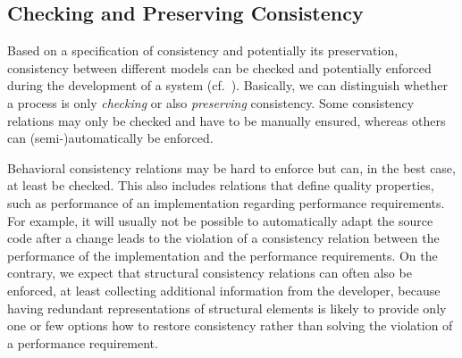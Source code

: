 \subsection{Checking and Preserving Consistency}
\label{chap:networks:notions:check_preserve}

Based on a specification of consistency and potentially its preservation, consistency between different models can be checked and potentially enforced during the development of a system (cf.~\cite{qvt}).
Basically, we can distinguish whether a process is only \emph{checking} or also \emph{preserving} consistency.
Some consistency relations may only be checked and have to be manually ensured, whereas others can (semi-)automatically be enforced.

Behavioral consistency relations may be hard to enforce but can, in the best case, at least be checked.
This also includes relations that define quality properties, such as performance of an implementation regarding performance requirements.
For example, it will usually not be possible to automatically adapt the source code after a change leads to the violation of a consistency relation between the performance of the implementation and the performance requirements.
On the contrary, we expect that structural consistency relations can often also be enforced, at least collecting additional information from the developer, because having redundant representations of structural elements is likely to provide only one or few options how to restore consistency rather than solving the violation of a performance requirement.

